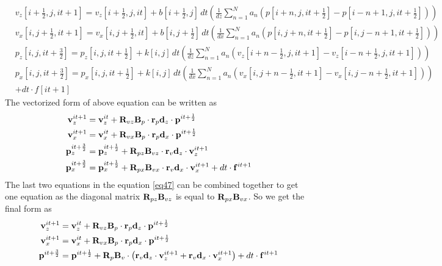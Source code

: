 \documentclass[revised,endfloat]{geophysics}
\begin{document}
\begin{equation}
\begin{split}
& v_z[i+\frac{1}{2},j,it+1] = v_z[i+\frac{1}{2},j,it] + b[i+\frac{1}{2},j] \, dt\left(\frac{1}{dz} \sum_{n=1}^N  a_n \left( p[i+n,j,it+\frac{1}{2}] - p[i-n+1,j,it+\frac{1}{2}] \right)  \right) \\
& v_x[i,j+\frac{1}{2},it+1] = v_x[i,j+\frac{1}{2},it] + b[i,j+\frac{1}{2}] \, dt
\left( \frac{1}{dx} \sum_{n=1}^N  a_n \left( p[i,j+n,it+\frac{1}{2}] - p[i,j-n+1,it+\frac{1}{2}]\right) \right) \\
& p_z[i,j,it+\frac{3}{2}] =  p_z[i,j,it+\frac{1}{2}] + k[i,j] \, dt \left(\frac{1}{dz} \sum_{n=1}^N  a_n \left( v_z[i+n-\frac{1}{2},j,it+1] - v_z[i-n+\frac{1}{2},j,it+1] \right)  \right) \\
&p_x[i,j,it+\frac{3}{2}] =  p_x[i,j,it+\frac{1}{2}]+ k[i,j]\, dt \left(\frac{1}{dx} \sum_{n=1}^N  a_n \left(v_x[i,j+n-\frac{1}{2},it+1] - v_x[i,j-n+\frac{1}{2},it+1] \right) \right) \\
&+ dt \cdot f[it+1]   
\end{split}
\label{eq46}
\end{equation}
The vectorized form of above equation can be written as
\begin{equation}
\begin{split}
{\bf v}_z^{it+1} &= {\bf v}_z^{it} +  {\bf R}_{vz}{\bf B}_{p} \cdot {\bf r}_p{\bf d}_z \cdot {\bf p}^{it+\frac{1}{2}} \\
{\bf v}_x^{it+1} &= {\bf v}_x^{it} +  {\bf R}_{vx}{\bf B}_{p} \cdot {\bf r}_p{\bf d}_x \cdot {\bf p}^{it+\frac{1}{2}}  \\
{\bf p}_z^{it+\frac{3}{2}} &=  {\bf p}_z^{it+\frac{1}{2}} +  {\bf R}_{pz}{\bf B}_{vz} \cdot {\bf r}_v{\bf d}_z \cdot {\bf v}_z^{it+1}  \\
{\bf p}_x^{it+\frac{3}{2}} &=   {\bf p}_x^{it+\frac{1}{2}} +  {\bf R}_{px}{\bf B}_{vx} \cdot {\bf r}_v{\bf d}_x \cdot {\bf v}_x^{it+1} + dt \cdot {\bf f}^{it+1}  \\
\end{split}
\label{eq47}
\end{equation}
The last two equations in the equation \ref{eq47} can be combined together to get one equation as the diagonal matrix  ${\bf R}_{pz}{\bf B}_{vz}$ is equal to ${\bf R}_{px}{\bf B}_{vx}$. So we get the final form as
\begin{equation}
\begin{split}
{\bf v}_z^{it+1} &= {\bf v}_z^{it} +  {\bf R}_{vz}{\bf B}_{p} \cdot {\bf r}_p{\bf d}_z \cdot {\bf p}^{it+\frac{1}{2}} \\
{\bf v}_x^{it+1} &= {\bf v}_x^{it} +  {\bf R}_{vx}{\bf B}_{p} \cdot {\bf r}_p{\bf d}_x \cdot {\bf p}^{it+\frac{1}{2}}  \\
{\bf p}^{it+\frac{3}{2}} &=  {\bf p}^{it+\frac{1}{2}} +  {\bf R}_{p}{\bf B}_{v} \cdot \left( {\bf r}_v{\bf d}_z \cdot {\bf v}_z^{it+1} +  {\bf r}_v{\bf d}_x \cdot {\bf v}_x^{it+1} \right)+ dt \cdot {\bf f}^{it+1}  \\
\end{split}
\label{eq48}
\end{equation}
\end{document}
